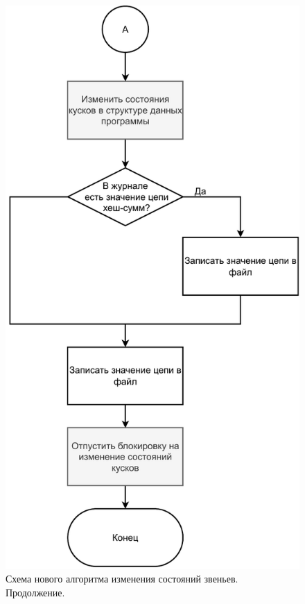 \begin{figure}[hbtp]
	\centering
	\includegraphics[scale=0.8]{img/mainalgo2.pdf}
	\caption{Схема нового алгоритма изменения состояний звеньев. Продолжение.}
	\label{fig:mainalgo2}
\end{figure}

